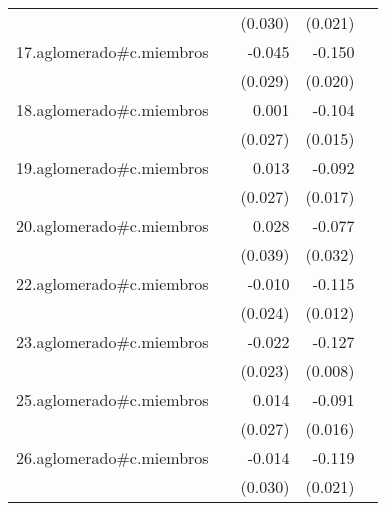 {\begin{longtable}{l*{4}{D{.}{.}{-1}}}
            &                     &     (0.030)         &     (0.021)         &                     \\
\addlinespace
17.aglomerado#c.miembros&                     &      -0.045         &      -0.150\sym{***}&                     \\
            &                     &     (0.029)         &     (0.020)         &                     \\
\addlinespace
18.aglomerado#c.miembros&                     &       0.001         &      -0.104\sym{***}&                     \\
            &                     &     (0.027)         &     (0.015)         &                     \\
\addlinespace
19.aglomerado#c.miembros&                     &       0.013         &      -0.092\sym{***}&                     \\
            &                     &     (0.027)         &     (0.017)         &                     \\
\addlinespace
20.aglomerado#c.miembros&                     &       0.028         &      -0.077\sym{*}  &                     \\
            &                     &     (0.039)         &     (0.032)         &                     \\
\addlinespace
22.aglomerado#c.miembros&                     &      -0.010         &      -0.115\sym{***}&                     \\
            &                     &     (0.024)         &     (0.012)         &                     \\
\addlinespace
23.aglomerado#c.miembros&                     &      -0.022         &      -0.127\sym{***}&                     \\
            &                     &     (0.023)         &     (0.008)         &                     \\
\addlinespace
25.aglomerado#c.miembros&                     &       0.014         &      -0.091\sym{***}&                     \\
            &                     &     (0.027)         &     (0.016)         &                     \\
\addlinespace
26.aglomerado#c.miembros&                     &      -0.014         &      -0.119\sym{***}&                     \\
            &                     &     (0.030)         &     (0.021)         &                     \\

\end{longtable}}
